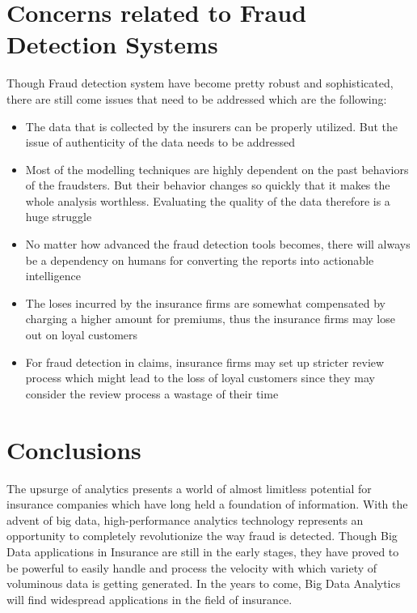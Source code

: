 \documentclass[sigconf]{acmart}
\begin{document}
\section{Concerns related to Fraud Detection Systems}
Though Fraud detection system have become pretty robust and sophisticated, there are still come issues that need to be addressed which are the following:
\begin{itemize}
  \item The data that is collected by the insurers can be properly utilized. But the issue of authenticity of the data needs to be addressed
  \item Most of the modelling techniques are highly dependent on the past behaviors of the fraudsters. But their behavior changes so quickly that it makes the whole analysis worthless. Evaluating the quality of the data therefore is a huge struggle
  \item No matter how advanced the fraud detection tools becomes, there will always be a dependency on humans for converting the reports into actionable intelligence
  \item The loses incurred by the insurance firms are somewhat compensated by charging a higher amount for premiums, thus the insurance firms may lose out on loyal customers
  \item For fraud detection in claims, insurance firms may set up stricter review process which might lead to the loss of loyal customers since they may consider the review process a wastage of their time\cite{link8}
\end{itemize} 


\section{Conclusions}
The upsurge of analytics presents a world of almost limitless potential for insurance companies which have long held a foundation of information.  With the advent of big data, high-performance analytics technology represents an opportunity to completely revolutionize the way fraud is detected. Though Big Data applications in Insurance are still in the early stages, they have proved to be powerful to easily handle and process the velocity with which variety of voluminous data is getting generated. In the years to come, Big Data Analytics will find widespread applications in the field of insurance.



 
\end{document}
